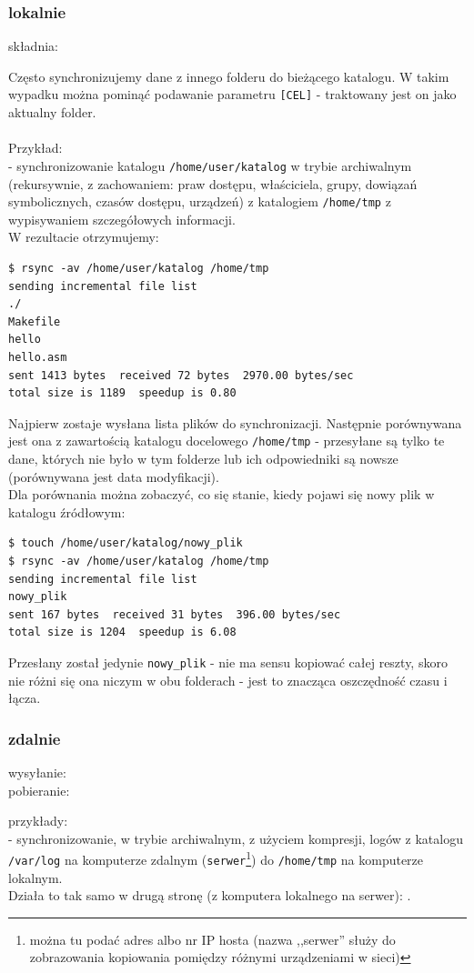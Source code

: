\subsubsection{lokalnie}
\label{przyklad_lokal}
\begin{center}
składnia: 
\end{center}
Często synchronizujemy dane z innego folderu do bieżącego katalogu. W takim wypadku można pominąć podawanie parametru \verb|[CEL]| - traktowany jest on jako aktualny folder. \\\\
Przykład:\\
 - synchronizowanie katalogu \verb|/home/user/katalog| w trybie archiwalnym (rekursywnie, z zachowaniem: praw dostępu, właściciela, grupy, dowiązań symbolicznych, czasów dostępu, urządzeń) z katalogiem \verb|/home/tmp| z wypisywaniem szczegółowych informacji.\\
W rezultacie otrzymujemy: 
\begin{verbatim}
$ rsync -av /home/user/katalog /home/tmp
sending incremental file list
./
Makefile
hello
hello.asm
sent 1413 bytes  received 72 bytes  2970.00 bytes/sec
total size is 1189  speedup is 0.80
\end{verbatim}
Najpierw zostaje wysłana lista plików do synchronizacji. Następnie porównywana jest ona z zawartością katalogu docelowego \verb|/home/tmp| - przesyłane są tylko te dane, których nie było w tym folderze lub ich odpowiedniki są nowsze (porównywana jest data modyfikacji).\\
Dla porównania można zobaczyć, co się stanie, kiedy pojawi się nowy plik w katalogu źródłowym:
\begin{verbatim}
$ touch /home/user/katalog/nowy_plik
$ rsync -av /home/user/katalog /home/tmp
sending incremental file list
nowy_plik
sent 167 bytes  received 31 bytes  396.00 bytes/sec
total size is 1204  speedup is 6.08
\end{verbatim}
Przesłany został jedynie \verb|nowy_plik| - nie ma sensu kopiować całej reszty, skoro nie różni się ona niczym w obu folderach - jest to znacząca oszczędność czasu i łącza.

\subsubsection{zdalnie}
\label{zdaln}
\begin{center}
 wysyłanie:  \\
 pobieranie: 
\end{center}
przykłady:\\
 - synchronizowanie, w trybie archiwalnym, z użyciem kompresji, logów z katalogu \verb|/var/log| na komputerze zdalnym (\verb|serwer|\footnote{można tu podać adres albo nr IP hosta (nazwa ,,serwer'' służy do zobrazowania kopiowania pomiędzy różnymi urządzeniami w sieci)}) do \verb|/home/tmp| na komputerze lokalnym.\\
Działa to tak samo w drugą stronę (z komputera lokalnego na serwer): .

